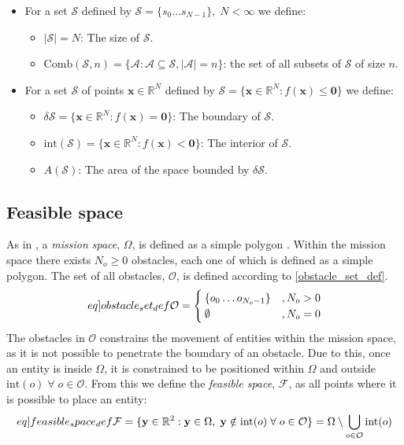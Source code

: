 \begin{itemize}
  \item For a set $\mathcal{S}$ defined by $\mathcal{S} = \{s_{0}\hdots s_{N-1}\},\;N<\infty$ we define:
  \begin{itemize}
    \item $|\mathcal{S}| = N$: The size of $\mathcal{S}$.
    \item $\mathrm{Comb}(\mathcal{S}, n) = \{\mathcal{A}: \mathcal{A}\subseteq\mathcal{S}, |\mathcal{A}|=n\}$: the set of all subsets of $\mathcal{S}$ of size $n$.
  \end{itemize}
  \item For a set $\mathcal{S}$ of points $\mathbf{x}\in\mathbb{R}^{N}$ defined by $\mathcal{S} = \{\mathbf{x}\in\mathbb{R}^{N}: f(\mathbf{x})\leq\mathbf{0}\}$ we define:
  \begin{itemize}
    \item $\delta\mathcal{S} = \{\mathbf{x}\in\mathbb{R}^{N}: f(\mathbf{x}) = \mathbf{0}\}$: The boundary of $\mathcal{S}$.
    \item $\mathrm{int}(\mathcal{S}) = \{\mathbf{x}\in\mathbb{R}^{N}: f(\mathbf{x}) < \mathbf{0}\}$: The interior of $\mathcal{S}$.
    \item $A(\mathcal{S})$: The area of the space bounded by $\delta\mathcal{S}$.
  \end{itemize}
\end{itemize}
\clearpage

\subsection{Feasible space}
As in \cite{sun2014escaping}, a \textit{mission space}, $\Omega$, is defined as a simple polygon 
\cite{weissteinsimplepolygon}.
Within the mission space there exists $N_{o}\geq 0$ obstacles, each one of which is defined as a simple polygon.
The set of all obstacles, $\mathcal{O}$, is defined according to \eqref{obstacle_set_def}.
\begin{equation}\label[eq]{obstacle_set_def}
  \mathcal{O} = \begin{cases}
    \{o_{0}\hdots o_{N_{o}-1}\} &, N_{o} > 0\\
    \emptyset &, N_{o} = 0\\
  \end{cases}
\end{equation}
The obstacles in $\mathcal{O}$ constrains the movement of entities within the mission space, as it is not possible to
penetrate the boundary of an obstacle. Due to this, once an entity is inside $\Omega$, it is constrained to be positioned within
$\Omega$ and outside $\mathrm{int}(o)\;\forall\;o\in\mathcal{O}$. From this we define the \textit{feasible space}, $\mathcal{F}$, as
all points where it is possible to place an entity:
\begin{equation}\label[eq]{feasible_space_def}
  \mathcal{F} = \{\mathbf{y}\in\mathbb{R}^{2}: \mathbf{y}\in\Omega,\;\mathbf{y}\notin\mathrm{int}(o)\;\forall\;o\in\mathcal{O}\} = \Omega\setminus\bigcup_{o\in\mathcal{O}}\mathrm{int}(o)
\end{equation}

